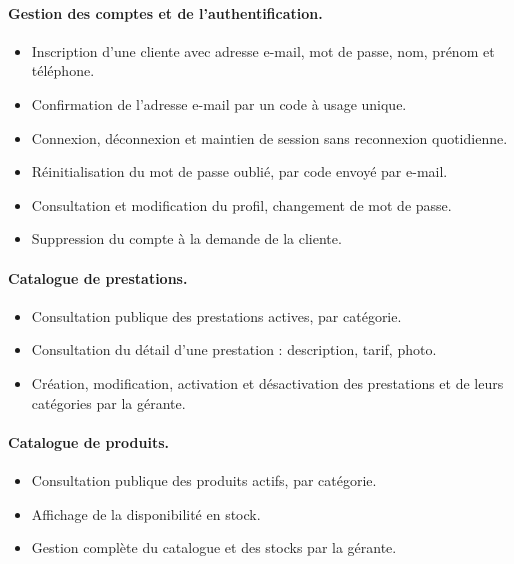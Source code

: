 \paragraph{Gestion des comptes et de l'authentification.}
\begin{itemize}[leftmargin=1.2cm,nosep]
  \item Inscription d'une cliente avec adresse e-mail, mot de passe, nom,
  prénom et téléphone.
  \item Confirmation de l'adresse e-mail par un code à usage unique.
  \item Connexion, déconnexion et maintien de session sans reconnexion
  quotidienne.
  \item Réinitialisation du mot de passe oublié, par code envoyé par e-mail.
  \item Consultation et modification du profil, changement de mot de passe.
  \item Suppression du compte à la demande de la cliente.
\end{itemize}

\paragraph{Catalogue de prestations.}
\begin{itemize}[leftmargin=1.2cm,nosep]
  \item Consultation publique des prestations actives, par catégorie.
  \item Consultation du détail d'une prestation : description, tarif, photo.
  \item Création, modification, activation et désactivation des prestations et
  de leurs catégories par la gérante.
\end{itemize}

\paragraph{Catalogue de produits.}
\begin{itemize}[leftmargin=1.2cm,nosep]
  \item Consultation publique des produits actifs, par catégorie.
  \item Affichage de la disponibilité en stock.
  \item Gestion complète du catalogue et des stocks par la gérante.
\end{itemize}


